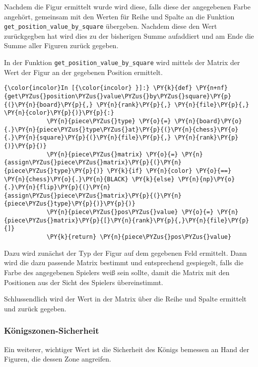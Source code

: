    Nachdem die Figur ermittelt wurde wird diese, falls diese der
angegebenen Farbe angehört, gemeinsam mit den Werten für Reihe und
Spalte an die Funktion \texttt{get\_position\_value\_by\_square}
übergeben. Nachdem diese den Wert zurückgegben hat wird dies zu der
bisherigen Summe aufaddiert und am Ende die Summe aller Figuren zurück
gegeben.

In der Funktion \texttt{get\_position\_value\_by\_square} wird mittels
der Matrix der Wert der Figur an der gegebenen Position ermittelt.

    \begin{Verbatim}[commandchars=\\\{\}]
{\color{incolor}In [{\color{incolor} }]:} \PY{k}{def} \PY{n+nf}{get\PYZus{}position\PYZus{}value\PYZus{}by\PYZus{}square}\PY{p}{(}\PY{n}{board}\PY{p}{,} \PY{n}{rank}\PY{p}{,} \PY{n}{file}\PY{p}{,} \PY{n}{color}\PY{p}{)}\PY{p}{:}
            \PY{n}{piece\PYZus{}type} \PY{o}{=} \PY{n}{board}\PY{o}{.}\PY{n}{piece\PYZus{}type\PYZus{}at}\PY{p}{(}\PY{n}{chess}\PY{o}{.}\PY{n}{square}\PY{p}{(}\PY{n}{file}\PY{p}{,} \PY{n}{rank}\PY{p}{)}\PY{p}{)}
            \PY{n}{piece\PYZus{}matrix} \PY{o}{=} \PY{n}{assign\PYZus{}piece\PYZus{}matrix}\PY{p}{(}\PY{n}{piece\PYZus{}type}\PY{p}{)} \PY{k}{if} \PY{n}{color} \PY{o}{==} \PY{n}{chess}\PY{o}{.}\PY{n}{BLACK} \PY{k}{else} \PY{n}{np}\PY{o}{.}\PY{n}{flip}\PY{p}{(}\PY{n}{assign\PYZus{}piece\PYZus{}matrix}\PY{p}{(}\PY{n}{piece\PYZus{}type}\PY{p}{)}\PY{p}{)}
            \PY{n}{piece\PYZus{}pos\PYZus{}value} \PY{o}{=} \PY{n}{piece\PYZus{}matrix}\PY{p}{[}\PY{n}{rank}\PY{p}{,}\PY{n}{file}\PY{p}{]}
            \PY{k}{return} \PY{n}{piece\PYZus{}pos\PYZus{}value}
\end{Verbatim}

    Dazu wird zunächst der Typ der Figur auf dem gegebenen Feld ermittelt.
Dann wird die dazu passende Matrix bestimmt und entsprechend gespiegelt,
falls die Farbe des angegebenen Spielers weiß sein sollte, damit die
Matrix mit den Positionen aus der Sicht des Spielers übereinstimmt.

Schlussendlich wird der Wert in der Matrix über die Reihe und Spalte
ermittelt und zurück gegeben.

    \subsubsection{Königszonen-Sicherheit}\label{kuxf6nigszonen-sicherheit}

Ein weiterer, wichtiger Wert ist die Sicherheit des Königs bemessen an
Hand der Figuren, die dessen Zone angreifen.

